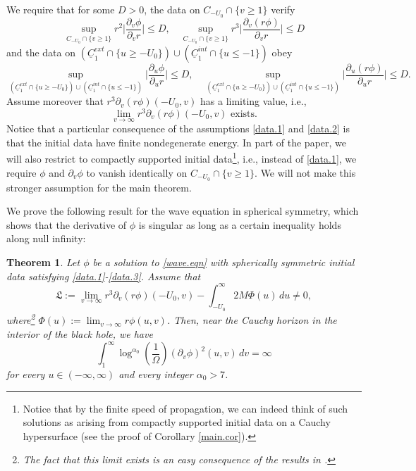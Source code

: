 \documentclass[12 pt, reqno]{amsart}
\newtheorem{theorem}{Theorem}[section]
\theoremstyle{definition}
\theoremstyle{remark}
\numberwithin{equation}{section}
\newcommand{\abs}[1]{\vert#1\vert}
\newcommand{\set}[1]{\{#1\}}
\newcommand{\ud}{d}
\newcommand{\rd}{\partial}
\newcommand{\0}{\emptyset}
\newcommand{\uC}{\underline{C}}
\newcommand{\f}{\frac}
\begin{document}
We require that for some $D>0$, the data on $C_{-U_0}\cap \set{v\geq 1}$ verify
\begin{equation}\label{data.1}
\sup_{C_{-U_0} \cap \set{v \geq 1}} r^{2} \abs{\frac{\rd_{v} \phi}{\rd_{v} r}} \leq D, \quad
	\sup_{C_{-U_0} \cap \set{v \geq 1}} r^3 \abs{\frac{\rd_{v}(r \phi)}{\rd_{v} r}} \leq D
\end{equation}
and the data on ${(\uC_{1}^{ext} \cap \set{u \geq -U_{0}})\cup(\uC_{1}^{int} \cap \set{u \leq -1})}$ obey
\begin{equation} \label{data.2}
	\sup_{(\uC_{1}^{ext} \cap \set{u \geq -U_{0}})\cup(\uC_{1}^{int} \cap \set{u \leq -1})} \abs{\frac{\rd_{u} \phi}{\rd_{u} r}} \leq D, \quad
	\sup_{(\uC_{1}^{ext} \cap \set{u \geq -U_{0}})\cup(\uC_{1}^{int} \cap \set{u \leq -1})} \abs{\frac{\rd_{u}(r \phi)}{\rd_{u} r}} \leq D.
\end{equation}
Assume moreover that $r^3\rd_v(r\phi)(-U_0,v)$ has a limiting value, i.e.,
\begin{equation}\label{data.3}
\lim_{v\to\infty}r^3\rd_v(r\phi)(-U_0,v)\mbox{ exists}.
\end{equation}
Notice that a particular consequence of the assumptions \eqref{data.1} and \eqref{data.2} is that the initial data have finite nondegenerate energy. In part of the paper, we will also restrict to compactly supported initial data\footnote{Notice that by the finite speed of propagation, we can indeed think of such solutions as arising from compactly supported initial data on a Cauchy hypersurface (see the proof of Corollary \ref{main.cor}).}, i.e., instead of \eqref{data.1}, we require $\phi$ and $\rd_v\phi$ to vanish identically on $C_{-U_0}\cap \set{v\geq 1}$. We will not make this stronger assumption for the main theorem.

We prove the following result for the wave equation in spherical symmetry, which shows that the derivative of $\phi$ is singular as long as a certain inequality holds along null infinity:
\begin{theorem}\label{decay.thm}
Let $\phi$ be a solution to \eqref{wave.eqn} with spherically symmetric initial data satisfying \eqref{data.1}-\eqref{data.3}. Assume that
\begin{equation}\label{L.condition}
	\mathfrak{L} := \lim_{v \to \infty} r^{3} \rd_{v} (r \phi)(-U_0, v) - \int_{-U_0}^{\infty} 2 M \Phi(u)  \, \ud u \neq 0,
\end{equation}
where\footnote{The fact that this limit exists is an easy consequence of the results in \cite{DRPL}.} $\Phi(u) := \lim_{v \to \infty} r \phi(u,v)$. Then, near the Cauchy horizon in the interior of the black hole, we have
\begin{equation}\label{blow.up.bd}
\int_{1}^\infty \log^{\alpha_0}(\f 1{\Omega}) (\rd_v\phi)^2(u,v)\, dv=\infty
\end{equation}
for every $u\in (-\infty,\infty)$ and every integer $\alpha_0>7$.
\end{theorem}
\end{document}
